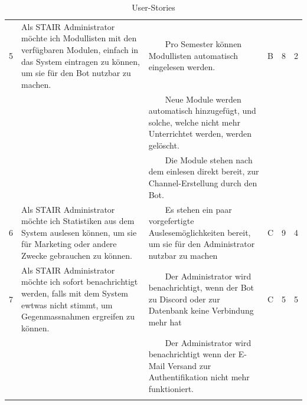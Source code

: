 \documentclass[a4paper, table]{article}
\newcommand{\tabitem}{~~\llap{\textbullet}~~}
\begin{document}
\begin{longtable}{ | p{1em} | p{16em} | p{13em} | p{2em} | p{3em} | p{2em} |}
    \hline
    5 & Als STAIR Administrator möchte ich Modullisten mit den verfügbaren Modulen, einfach in das System eintragen zu können,
    um sie für den Bot nutzbar zu machen. &
    \tabitem Pro Semester können Modullisten automatisch eingelesen werden. & B & 8 & 2 \\*
     & & \tabitem Neue Module werden automatisch hinzugefügt, und solche, welche nicht mehr Unterrichtet werden, werden gelöscht. & & & \\*
     & & \tabitem Die Module stehen nach dem einlesen direkt bereit, zur Channel-Erstellung durch den Bot. & & & \\
    \hline
    6 & Als STAIR Administrator möchte ich Statistiken aus dem System auslesen können,
    um sie für Marketing oder andere Zwecke gebrauchen zu können. &
    \tabitem Es stehen ein paar vorgefertigte Auslesemöglichkeiten bereit, um sie für den Administrator nutzbar zu machen & C & 9 & 4 \\
    \hline
    7 & Als STAIR Administrator möchte ich sofort benachrichtigt werden, falls mit dem System ewtwas nicht stimmt,
    um Gegenmassnahmen ergreifen zu können. &
    \tabitem Der Administrator wird benachrichtigt, wenn der Bot zu Discord oder zur Datenbank keine Verbindung mehr hat & C & 5 & 5 \\*
     & & \tabitem Der Administrator wird benachrichtigt wenn der E-Mail Versand zur Authentifikation nicht mehr funktioniert. & & & \\
    \hline
    \caption{User-Stories}
    \label{tab: UserStories}
\end{longtable}
\end{document}
